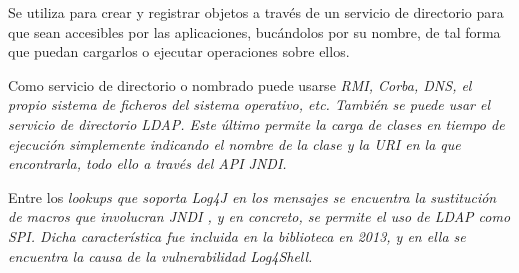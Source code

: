 \documentclass[../main.tex]{subfiles}
\begin{document}
Se utiliza para crear y registrar objetos a través de un servicio de directorio para que sean accesibles por las aplicaciones, bucándolos por su nombre, de tal forma que puedan cargarlos o ejecutar operaciones sobre ellos.

Como servicio de directorio o nombrado puede usarse \it{RMI}, \it{Corba}, \it{DNS}, el propio sistema de ficheros del sistema operativo, etc. También se puede usar el servicio de directorio \it{LDAP}. Este último permite la carga de clases en tiempo de ejecución simplemente indicando el nombre de la clase y la URI en la que encontrarla, todo ello a través del API \it{JNDI}.

Entre los \it{lookups} que soporta \it{Log4J} en los mensajes se encuentra la sustitución de macros que involucran \it{JNDI} \cite{log4j-lookup-jndi}, y en concreto, se permite el uso de \it{LDAP} como SPI. Dicha característica fue incluida en la biblioteca en 2013, y en ella se encuentra la causa de la vulnerabilidad \it{Log4Shell}.
\end{document}
